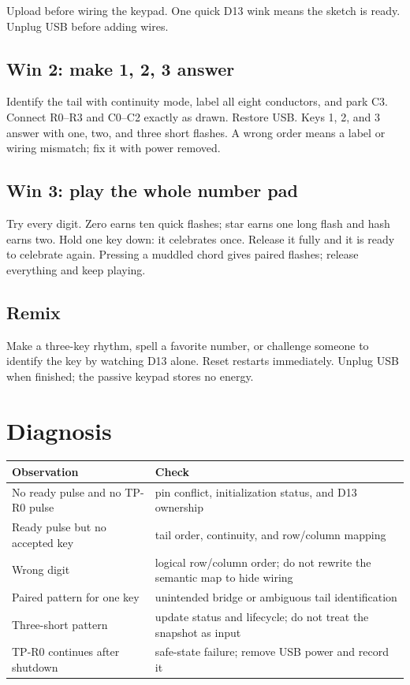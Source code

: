 \documentclass[11pt]{article}
\begin{document}
Upload before wiring the keypad. One quick D13 wink means the sketch is ready.
Unplug USB before adding wires.

\subsection{Win 2: make 1, 2, 3 answer}

Identify the tail with continuity mode, label all eight conductors, and park
C3. Connect R0--R3 and C0--C2 exactly as drawn. Restore USB. Keys 1, 2, and 3
answer with one, two, and three short flashes. A wrong order means a label or
wiring mismatch; fix it with power removed.

\subsection{Win 3: play the whole number pad}

Try every digit. Zero earns ten quick flashes; star earns one long flash and
hash earns two. Hold one key down: it celebrates once. Release it fully and it
is ready to celebrate again. Pressing a muddled chord gives paired flashes;
release everything and keep playing.

\subsection{Remix}

Make a three-key rhythm, spell a favorite number, or challenge someone to
identify the key by watching D13 alone. Reset restarts immediately. Unplug USB
when finished; the passive keypad stores no energy.

\section{Diagnosis}

\begin{tabularx}{\linewidth}{@{}l X@{}}
\toprule
Observation & Check\\
\midrule
No ready pulse and no TP-R0 pulse & pin conflict, initialization status, and D13 ownership\\
Ready pulse but no accepted key & tail order, continuity, and row/column mapping\\
Wrong digit & logical row/column order; do not rewrite the semantic map to hide wiring\\
Paired pattern for one key & unintended bridge or ambiguous tail identification\\
Three-short pattern & update status and lifecycle; do not treat the snapshot as input\\
TP-R0 continues after shutdown & safe-state failure; remove USB power and record it\\
\bottomrule
\end{tabularx}
\end{document}
